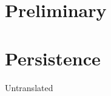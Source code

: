 \documentclass[11pt,oneside,a4paper, openany]{book}
\begin{document}
\setcounter{tocdepth}{1}

\begingroup
\let\cleardoublepage\clearpage
\tableofcontents
\endgroup

\mainmatter
{}



\part{Preliminary} \label{part:prelim}
%





\part{Persistence} \label{part:persist}

Untranslated
%

%
%

%
%

%
%

%

%
%
%

%



\end{document}

